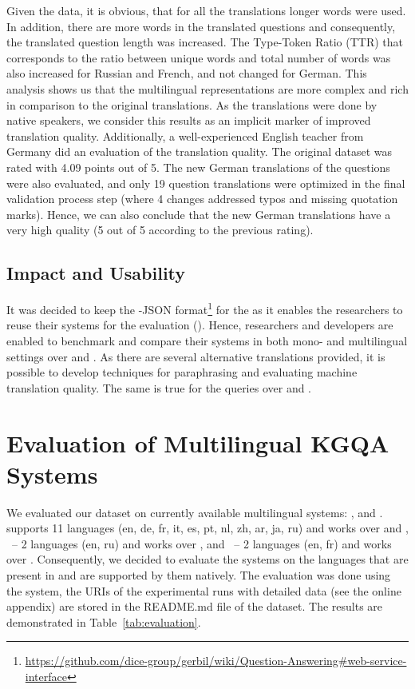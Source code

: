 \documentclass[conference]{IEEEtran}
\begin{document}
Given the data, it is obvious, that for all the \QALDplus translations longer words were used.
In addition, there are more words in the \QALDplus translated questions and consequently, the translated question length was increased.
The Type-Token Ratio (TTR) that corresponds to the ratio between unique words and total number of words was also increased for Russian and French, and not changed for German.
This analysis shows us that the \QALDplus multilingual representations are more complex and rich in comparison to the original  translations.
As the translations were done by native speakers, we consider this results as an implicit marker of improved translation quality.
Additionally, a well-experienced English teacher from Germany did an evaluation of the translation quality. 
The original dataset was rated with 4.09 points out of 5. 
The new German translations of the questions were also evaluated, and only 19 question translations were optimized in the final validation process step (where 4 changes addressed typos and missing quotation marks).
Hence, we can also conclude that the new German translations have a very high quality (5 out of 5 according to the previous rating). 

\subsection{Impact and Usability}
It was decided to keep the \QALD-JSON format\footnote{\url{https://github.com/dice-group/gerbil/wiki/Question-Answering\#web-service-interface}} for the \QALDplus as it enables the researchers to reuse their systems for the evaluation (\eg \GERBIL \cite{Gerbil}). 
Hence, researchers and developers are enabled to benchmark and compare their \KGQA systems in both mono- and multilingual settings over \DBpedia and \Wikidata.
As there are several alternative translations provided, it is possible to develop techniques for paraphrasing and evaluating machine translation quality.
The same is true for the \SPARQL queries over \DBpedia and \Wikidata.
\section{Evaluation of Multilingual KGQA Systems}\label{sec:evaluation}

We evaluated our \QALDplus dataset on currently available multilingual \KGQA systems: \QAnswer\cite{QAnswer}, \DeepPavlov\cite{deeppavlov} and \Platypus\cite{tanon2018demoing}.
\QAnswer supports 11 languages (en, de, fr, it, es, pt, nl, zh, ar, ja, ru) and works over \DBpedia and \Wikidata, \DeepPavlov\ -- 2 languages (en, ru) and works over \Wikidata, and \Platypus\ -- 2 languages (en, fr) and works over \Wikidata.
Consequently, we decided to evaluate the systems on the languages that are present in \QALDplus and are supported by them natively.
The evaluation was done using the \GERBIL system, the URIs of the experimental runs with detailed data (see the online appendix) are stored in the README.md file of the dataset.
The results are demonstrated in Table~\ref{tab:evaluation}.
\end{document}
